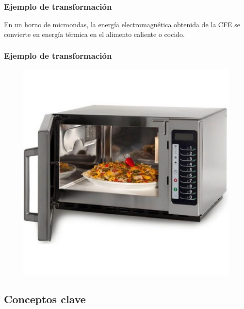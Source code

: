\documentclass[14pt]{beamer}
\begin{document}
\begin{frame}
\frametitle{Ejemplo de transformación}    
En un horno de microondas, la energía electromagnética obtenida de la CFE se convierte en energía térmica en el alimento caliente o cocido.
\end{frame}
\begin{frame}
\frametitle{Ejemplo de transformación}    
\begin{figure}
    \centering
    \includegraphics[scale=0.3]{Imagenes/Energia_02.jpg}
\end{figure}
\end{frame}

\subsection{Conceptos clave}
\end{document}
